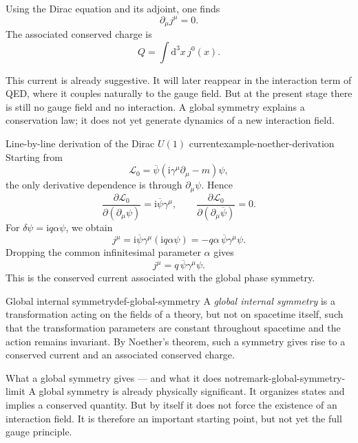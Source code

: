 \documentclass[11pt,a4paper]{article}
\newcommand{\Lag}{\mathcal{L}}
\newcommand{\ii}{\mathrm{i}}
\newcommand{\dd}{\mathrm{d}}
\newcommand{\p}{\partial}
\newcommand{\gmu}{\gamma^\mu}
\newcommand{\psibar}{\overline{\psi}}
\begin{document}
Using the Dirac equation and its adjoint, one finds
\begin{equation}
\p_\mu j^\mu = 0.
\label{eq:continuity-equation-expanded}
\end{equation}
The associated conserved charge is
\begin{equation}
Q = \int \dd^3x\,j^0(x).
\label{eq:conserved-charge-expanded}
\end{equation}

This current is already suggestive. It will later reappear in the interaction term of QED, where it couples naturally to the gauge field. But at the present stage there is still no gauge field and no interaction. A global symmetry explains a conservation law; it does not yet generate dynamics of a new interaction field.

\begin{examplebox}{Line-by-line derivation of the Dirac \texorpdfstring{$U(1)$}{U(1)} current}{example-noether-derivation}
Starting from
\[
\Lag_0=\psibar(\ii\gmu\p_\mu-m)\psi,
\]
the only derivative dependence is through \(\p_\mu\psi\). Hence
\[
\frac{\p\Lag_0}{\p(\p_\mu\psi)}=\ii\psibar\gamma^\mu,
\qquad
\frac{\p\Lag_0}{\p(\p_\mu\psibar)}=0.
\]
For \(\delta\psi=\ii q\alpha\psi\), we obtain
\[
j^\mu = \ii\psibar\gamma^\mu(\ii q\alpha\psi)= - q\alpha\,\psibar\gamma^\mu\psi.
\]
Dropping the common infinitesimal parameter \(\alpha\) gives
\[
j^\mu=q\,\psibar\gamma^\mu\psi.
\]
This is the conserved current associated with the global phase symmetry.
\end{examplebox}

\begin{definition}{Global internal symmetry}{def-global-symmetry}
A \emph{global internal symmetry} is a transformation acting on the fields of a theory, but not on spacetime itself, such that the transformation parameters are constant throughout spacetime and the action remains invariant. By Noether's theorem, such a symmetry gives rise to a conserved current and an associated conserved charge.
\end{definition}

\begin{remarkbox}{What a global symmetry gives --- and what it does not}{remark-global-symmetry-limit}
A global symmetry is already physically significant. It organizes states and implies a conserved quantity. But by itself it does not force the existence of an interaction field. It is therefore an important starting point, but not yet the full gauge principle.
\end{remarkbox}
\end{document}
